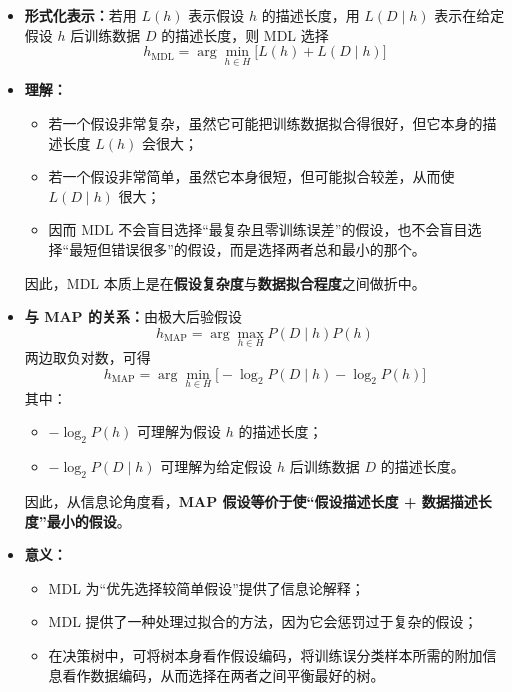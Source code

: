 \documentclass[../main.tex]{subfiles}
\begin{document}
\begin{enumerate}
\begin{itemize}
    \item \textbf{形式化表示：}若用 $L(h)$ 表示假设 $h$ 的描述长度，用 $L(D\mid h)$ 表示在给定假设 $h$ 后训练数据 $D$ 的描述长度，则 MDL 选择
    $$
    h_{\mathrm{MDL}}=\arg\min_{h\in H}\bigl[L(h)+L(D\mid h)\bigr]
    $$
    \item \textbf{理解：}
    \begin{itemize}
        \item 若一个假设非常复杂，虽然它可能把训练数据拟合得很好，但它本身的描述长度 $L(h)$ 会很大；
        \item 若一个假设非常简单，虽然它本身很短，但可能拟合较差，从而使 $L(D\mid h)$ 很大；
        \item 因而 MDL 不会盲目选择“最复杂且零训练误差”的假设，也不会盲目选择“最短但错误很多”的假设，而是选择两者总和最小的那个。
    \end{itemize}
    
    因此，MDL 本质上是在\textbf{假设复杂度}与\textbf{数据拟合程度}之间做折中。
    
    \item \textbf{与 MAP 的关系：}由极大后验假设
    $$
    h_{\mathrm{MAP}}=\arg\max_{h\in H}P(D\mid h)P(h)
    $$
    两边取负对数，可得
    $$
    h_{\mathrm{MAP}}
    =\arg\min_{h\in H}\bigl[-\log_2 P(D\mid h)-\log_2 P(h)\bigr]
    $$
    其中：
    \begin{itemize}
        \item $-\log_2 P(h)$ 可理解为假设 $h$ 的描述长度；
        \item $-\log_2 P(D\mid h)$ 可理解为给定假设 $h$ 后训练数据 $D$ 的描述长度。
    \end{itemize}
    因此，从信息论角度看，\textbf{MAP 假设等价于使“假设描述长度 + 数据描述长度”最小的假设}。

    \item \textbf{意义：}
    \begin{itemize}
        \item MDL 为“优先选择较简单假设”提供了信息论解释；
        \item MDL 提供了一种处理过拟合的方法，因为它会惩罚过于复杂的假设；
        \item 在决策树中，可将树本身看作假设编码，将训练误分类样本所需的附加信息看作数据编码，从而选择在两者之间平衡最好的树。
    \end{itemize}
\end{itemize}
\end{enumerate}



    
\end{document}
